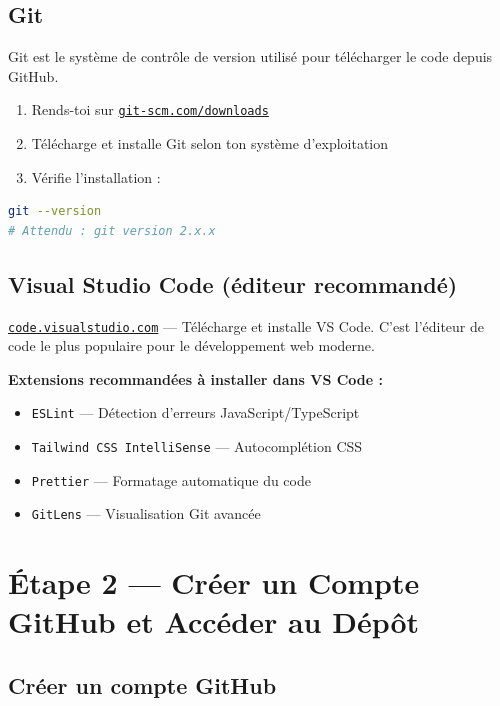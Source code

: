 \documentclass[12pt, a4paper]{article}
\begin{document}
\subsection{Git}

Git est le système de contrôle de version utilisé pour télécharger le code
depuis GitHub.

\begin{enumerate}[label=\arabic*.]
  \item Rends-toi sur \href{https://git-scm.com/downloads}{\texttt{git-scm.com/downloads}}
  \item Télécharge et installe Git selon ton système d'exploitation
  \item Vérifie l'installation :
\end{enumerate}

\begin{lstlisting}[language=bash]
git --version
# Attendu : git version 2.x.x
\end{lstlisting}

\subsection{Visual Studio Code (éditeur recommandé)}

\href{https://code.visualstudio.com}{\texttt{code.visualstudio.com}} — Télécharge
et installe VS Code. C'est l'éditeur de code le plus populaire pour le
développement web moderne.

\textbf{Extensions recommandées à installer dans VS Code :}
\begin{itemize}
  \item \texttt{ESLint} — Détection d'erreurs JavaScript/TypeScript
  \item \texttt{Tailwind CSS IntelliSense} — Autocomplétion CSS
  \item \texttt{Prettier} — Formatage automatique du code
  \item \texttt{GitLens} — Visualisation Git avancée
\end{itemize}

\section{Étape 2 — Créer un Compte GitHub et Accéder au Dépôt}

\subsection{Créer un compte GitHub}
\end{document}
